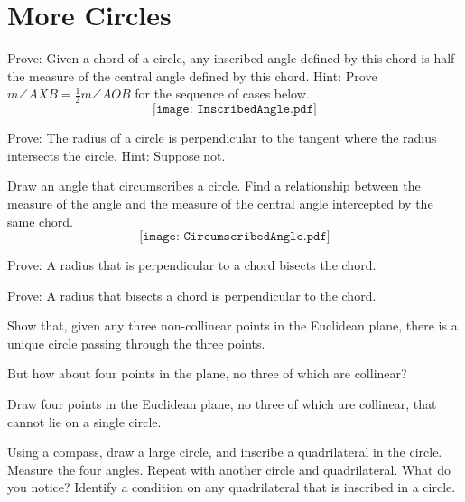 \newpage

\section{More Circles}

\begin{prob}
Prove:  Given a chord of a circle, any inscribed angle defined by this chord is half the measure of the central angle defined by this
chord.  Hint:  Prove $m\angle AXB = \frac{1}{2}m\angle AOB$ for the sequence of cases below.  
$$\texttt{[image: InscribedAngle.pdf]}$$
\end{prob}

\begin{prob}
Prove: The radius of a circle is perpendicular to the tangent where the radius intersects the circle.  Hint:  Suppose not. 
\end{prob}

\begin{prob}
Draw an angle that circumscribes a circle.  Find a relationship between the measure of the angle and the measure of the central angle intercepted by the same chord.
$$\texttt{[image: CircumscribedAngle.pdf]}$$
\end{prob}

\begin{prob}
Prove: A radius that is perpendicular to a chord bisects the chord. 
\end{prob}

\begin{prob}
Prove:  A radius that bisects a chord is perpendicular to the chord. 
\end{prob}

\begin{prob}
Show that, given any three non-collinear points in the Euclidean
plane, there is a unique circle passing through the three points.
\end{prob}

But how about four points in the plane, no three of which are collinear?

\begin{prob}
Draw four points in the Euclidean plane, no three of which are collinear, that cannot lie on a single circle.
\end{prob}

\begin{prob}
Using a compass, draw a large circle, and inscribe a quadrilateral in the circle.  Measure the four angles.  Repeat with another circle and quadrilateral.  What do you notice?  Identify a condition on any quadrilateral that is inscribed in a circle.  
\end{prob}


